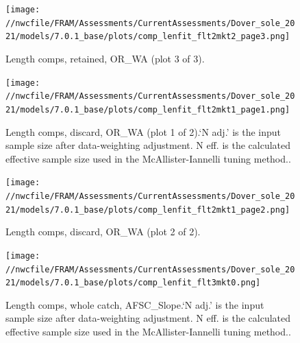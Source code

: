 \documentclass[11pt,
  english,
  a4paper,
]{article}
\begin{document}
\tagmcend\tagstructend


\begin{figure}
\centering
\texttt{[image: //nwcfile/FRAM/Assessments/CurrentAssessments/Dover\_sole\_2021/models/7.0.1\_base/plots/comp\_lenfit\_flt2mkt2\_page3.png]}
\caption{Length comps, retained, OR\_WA (plot 3 of 3).\label{fig:comp_lenfit_flt2mkt2_page3}}
\end{figure}

\tagmcend\tagstructend


\begin{figure}
\centering
\texttt{[image: //nwcfile/FRAM/Assessments/CurrentAssessments/Dover\_sole\_2021/models/7.0.1\_base/plots/comp\_lenfit\_flt2mkt1\_page1.png]}
\caption{Length comps, discard, OR\_WA (plot 1 of 2).`N adj.' is the input sample size after data-weighting adjustment. N eff. is the calculated effective sample size used in the McAllister-Iannelli tuning method..\label{fig:comp_lenfit_flt2mkt1_page1}}
\end{figure}

\tagmcend\tagstructend


\begin{figure}
\centering
\texttt{[image: //nwcfile/FRAM/Assessments/CurrentAssessments/Dover\_sole\_2021/models/7.0.1\_base/plots/comp\_lenfit\_flt2mkt1\_page2.png]}
\caption{Length comps, discard, OR\_WA (plot 2 of 2).\label{fig:comp_lenfit_flt2mkt1_page2}}
\end{figure}

\tagmcend\tagstructend


\begin{figure}
\centering
\texttt{[image: //nwcfile/FRAM/Assessments/CurrentAssessments/Dover\_sole\_2021/models/7.0.1\_base/plots/comp\_lenfit\_flt3mkt0.png]}
\caption{Length comps, whole catch, AFSC\_Slope.`N adj.' is the input sample size after data-weighting adjustment. N eff. is the calculated effective sample size used in the McAllister-Iannelli tuning method..\label{fig:comp_lenfit_flt3mkt0}}
\end{figure}
\end{document}
